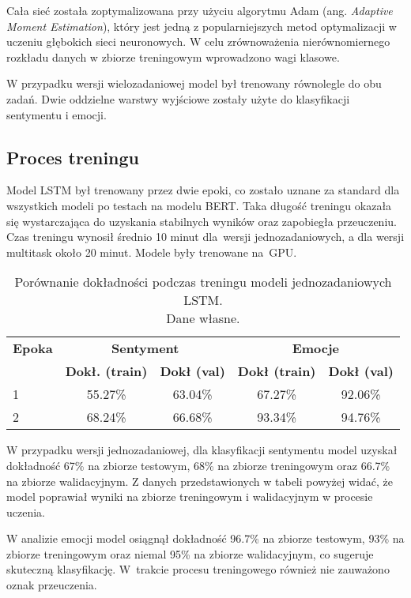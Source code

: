Cała sieć została zoptymalizowana przy użyciu algorytmu Adam (ang. \textit{Adaptive Moment Estimation}), który jest jedną z popularniejszych metod optymalizacji w uczeniu głębokich sieci neuronowych. W celu zrównoważenia nierównomiernego rozkładu danych w zbiorze treningowym wprowadzono wagi klasowe.

W przypadku wersji wielozadaniowej model był trenowany równolegle do obu zadań. Dwie oddzielne warstwy wyjściowe zostały użyte do klasyfikacji sentymentu i emocji.

\subsection{Proces treningu}
Model LSTM był trenowany przez dwie epoki, co zostało uznane za standard dla wszystkich modeli po testach na modelu BERT. Taka długość treningu okazała się wystarczająca do uzyskania stabilnych wyników oraz zapobiegła przeuczeniu. Czas treningu wynosił średnio 10 minut dla~wersji jednozadaniowych, a dla wersji multitask około 20 minut. Modele były trenowane na~GPU.

\begin{table}[H]
\centering
\label{tab:lstm_training_process}
\begin{tabular}{|l|c|c|c|c|}
\hline
\textbf{Epoka} & \multicolumn{2}{c|}{\textbf{Sentyment}} & \multicolumn{2}{c|}{\textbf{Emocje}} \\
\cline{2-5}
& \textbf{Dokł. (train)} & \textbf{Dokł (val)} & \textbf{Dokł (train)} & \textbf{Dokł (val)} \\
\hline
1 & 55.27\% & 63.04\% & 67.27\% & 92.06\% \\
2 & 68.24\% & 66.68\% & 93.34\% & 94.76\% \\
\hline
\end{tabular}
\caption{Porównanie dokładności podczas treningu modeli jednozadaniowych LSTM.\\Dane własne.}
\end{table}

W przypadku wersji jednozadaniowej, dla klasyfikacji sentymentu model uzyskał dokładność 67\% na zbiorze testowym, 68\% na zbiorze treningowym oraz 66.7\% na zbiorze walidacyjnym. Z danych przedstawionych w tabeli powyżej widać, że model poprawiał wyniki na zbiorze treningowym i walidacyjnym w procesie uczenia.

W analizie emocji model osiągnął dokładność 96.7\% na zbiorze testowym, 93\% na zbiorze treningowym oraz niemal 95\% na zbiorze walidacyjnym, co sugeruje skuteczną klasyfikację. W~trakcie procesu treningowego również nie zauważono oznak przeuczenia.

